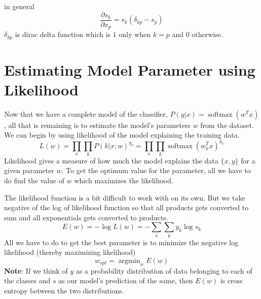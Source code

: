 \documentclass[12pt,crop=false,class=article,convert={density=300,outext=.compiled.png}]{standalone}
\begin{document}
in general
%
$$\frac{\partial s_k}{\partial x_p} = s_k(\delta_{kp} - s_p)$$
%
$\delta_{kp}$ is dirac delta function which is $1$ only when $k=p$ and
$0$ otherwise.

\section*{Estimating Model Parameter using Likelihood}


Now that we have a complete model of the classifier,
$P(y|x) = \operatorname{softmax}(w^Tx)$, all that is remaining is to
estimate the model's parameters $w$ from the dataset. We can begin by
using likelihood of the model explaining the training data.
%
$$L(w) = \prod_x \prod_k P(k|x;w)^{y_k} = \prod_x \prod_k \operatorname{softmax}(w_k^Tx)^{y_k} $$
%
Likelihood gives a measure of how much the model explains the data
$\{x,y\}$ for a given parameter $w$. To get the optimum value for the
parameter, all we have to do find the value of $w$ which maximizes the
likelihood.

The likelihood function is a bit difficult to work with on its own. But
we take negative of the log of likelihood function so that all
products gets converted to sum and all exponentials gets converted to
products.
%
$$E(w) = -\log L(w) = -\sum_x \sum_k y_k \log s_k$$
%
All we have to do to get the best parameter is to minimize the negative
log likelihood (thereby maximizing likelihood)
%
$$w_{opt} = \operatorname{argmin}_w  E(w)$$
%
\textbf{Note}: If we think of $y$ as a probability distribution of data
belonging to each of the classes and $s$ as our model's prediction of
the same, then $E(w)$ is cross entropy between the two distributions.
\end{document}
